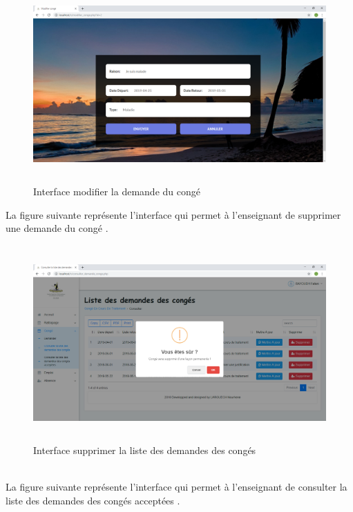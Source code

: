 \documentclass[12 pt ]{report}
\begin{document}
\begin{figure}[h]
 \begin{center}
\includegraphics[width= 18 cm ,height=  7.5cm]{modifier_conge.PNG}
\caption{Interface modifier la demande du congé}

\end{center}
\end{figure}
\newpage
La figure suivante représente l'interface qui permet à l'enseignant de supprimer une demande du congé .
\begin{figure}[h]
 \begin{center}
\includegraphics[width= 18 cm ,height=  7.5cm]{supprimer_conge.PNG}
\caption{Interface supprimer la liste des demandes des congés}

\end{center}
\end{figure}\\
La figure suivante représente l'interface qui permet à l'enseignant de consulter la liste des  demandes des congés acceptées .
\end{document}
